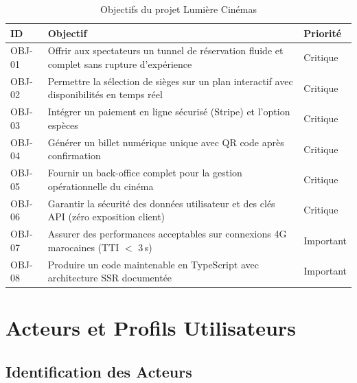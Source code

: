 \documentclass[12pt,a4paper,openany]{report}
\begin{document}
\begin{table}[H]
\centering
\begin{tabularx}{\textwidth}{lXl}
\toprule
\textbf{ID} & \textbf{Objectif} & \textbf{Priorité} \\
\midrule
OBJ-01 & Offrir aux spectateurs un tunnel de réservation fluide et complet sans rupture d'expérience & Critique \\
OBJ-02 & Permettre la sélection de sièges sur un plan interactif avec disponibilités en temps réel & Critique \\
OBJ-03 & Intégrer un paiement en ligne sécurisé (Stripe) et l'option espèces & Critique \\
OBJ-04 & Générer un billet numérique unique avec QR code après confirmation & Critique \\
OBJ-05 & Fournir un back-office complet pour la gestion opérationnelle du cinéma & Critique \\
OBJ-06 & Garantir la sécurité des données utilisateur et des clés API (zéro exposition client) & Critique \\
OBJ-07 & Assurer des performances acceptables sur connexions 4G marocaines (TTI $<$ 3\,s) & Important \\
OBJ-08 & Produire un code maintenable en TypeScript avec architecture SSR documentée & Important \\
\bottomrule
\end{tabularx}
\caption{Objectifs du projet Lumière Cinémas}
\end{table}

\chapter{Acteurs et Profils Utilisateurs}

\section{Identification des Acteurs}
\end{document}
